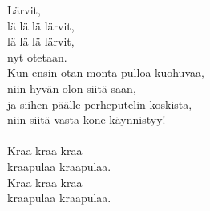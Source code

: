 
            Lärvit, \\
            lä lä lä lärvit, \\
            lä lä lä lärvit, \\
            nyt otetaan. \\
            Kun ensin otan monta pulloa kuohuvaa, \\
            niin hyvän olon siitä saan, \\
            ja siihen päälle perheputelin koskista, \\
            niin siitä vasta kone käynnistyy! \\
\hspace{10mm} \\
            Kraa kraa kraa \\
            kraapulaa kraapulaa. \\
            Kraa kraa kraa \\
            kraapulaa kraapulaa. \\
